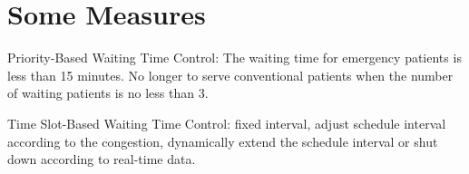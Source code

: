 \documentclass{article}
\newcommand{\Z}{\mathbf{Z}}
\newcommand{\D}{\bm{\Delta}}
\begin{document}








\section{Some Measures}
Priority-Based Waiting Time Control: The waiting time for emergency patients is less than 15 minutes. No longer to serve conventional patients when the number of waiting patients is no less than 3. 





Time Slot-Based Waiting Time Control: fixed interval, adjust schedule interval according to the congestion, dynamically extend the schedule interval or shut down according to real-time data.


\end{document}
